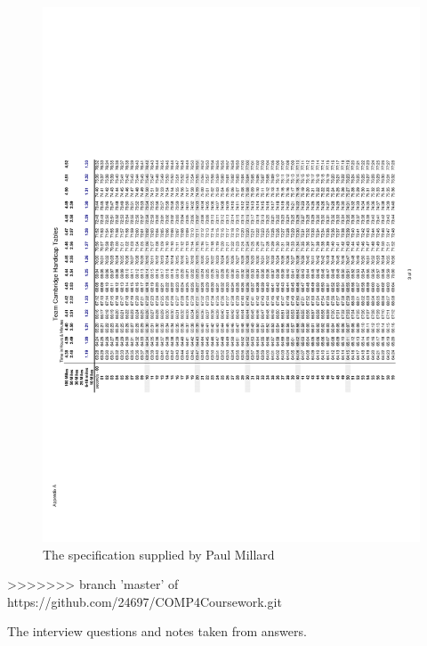 \begin{figure}[H]
    \includegraphics[width=\textwidth]{./TeamCambridgeSpec/page9.pdf}
     \caption{The specification supplied by Paul Millard} \label{fig:Specification}
\end{figure}

>>>>>>> branch 'master' of https://github.com/24697/COMP4Coursework.git

The interview questions and notes taken from answers.


